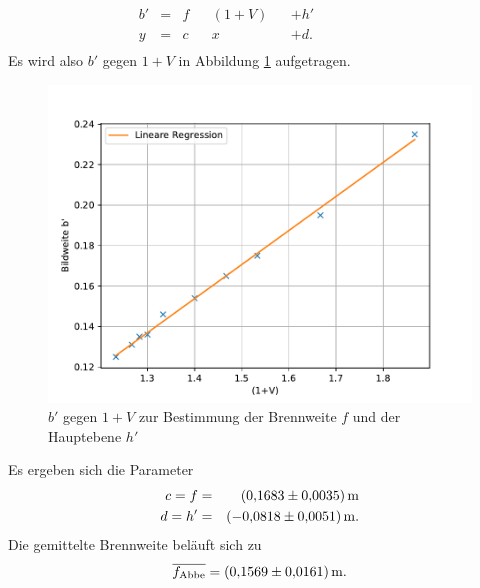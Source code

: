 \begin{align*}
  b' &=& f && (1+V) && + h' && && &&\\
  y  &=& c && x     && + d. && && &&\\
\end{align*}
Es wird also $b'$ gegen $1+V$ in Abbildung \ref{fig:abbe2} aufgetragen.
\begin{figure}[h!]
  \centering
  \includegraphics[width=\textwidth]{abbe2.pdf}
  \caption{$b'$ gegen $1+V$ zur Bestimmung der Brennweite $f$ und der Hauptebene $h'$}
  \label{fig:abbe2}
\end{figure}
Es ergeben sich die Parameter
\begin{align*}
  c = f  &=& \SI{ 0.1683 \pm 0.0035}{m}\\
  d = h' &=& \SI{-0.0818 \pm 0.0051}{m}.\\
\end{align*}
Die gemittelte Brennweite beläuft sich zu
\begin{align*}
  \overline{f_{\text{Abbe}}}= \SI{0.1569 \pm 0.0161}{m}.
\end{align*}


\FloatBarrier
